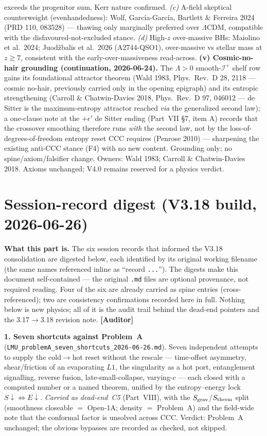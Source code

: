 \documentclass[11pt]{article}
\newcommand{\Auditor}{\textbf{\textcolor{teal!55!black}{[Auditor]}}}
\begin{document}
{exceeds the progenitor sum, Kerr nature confirmed. \emph{(c)} A-field skeptical counterweight (evenhandedness): Wolf, Garc\'ia-Garc\'ia, Bartlett \& Ferreira 2024 (PRD 110, 083528) --- thawing only marginally preferred over $\Lambda$CDM, compatible with the disfavoured-not-excluded stance. \emph{(d)} High-$z$ over-massive BHs: Maiolino et al.\ 2024; Juod\v{z}balis et al.\ 2026 (A2744-QSO1), over-massive vs stellar mass at $z\gtrsim7$, consistent with the early-over-massiveness read-across. \textbf{(v) Cosmic-no-hair grounding (continuation, 2026-06-24).} The $\Lambda>0$ smooth-$\mathscr I^+$ shelf row gains its foundational attractor theorem (Wald 1983, Phys.\ Rev.\ D 28, 2118 --- cosmic no-hair, previously carried only in the opening epigraph) and its entropic strengthening (Carroll \& Chatwin-Davies 2018, Phys.\ Rev.\ D 97, 046012 --- de Sitter is the maximum-entropy attractor reached \emph{via} the generalized second law); a one-clause note at the $+\epsilon'$ de Sitter ending (Part~VII \S7, item A) records that the crossover smoothing therefore runs \emph{with} the second law, not by the loss-of-degrees-of-freedom entropy reset CCC requires (Penrose 2010) --- sharpening the existing anti-CCC stance (F4) with no new content. Grounding only; no spine/axiom/falsifier change. Owners: Wald 1983; Carroll \& Chatwin-Davies 2018. Axioms unchanged; V4.0 remains reserved for a physics verdict.

}

\part{Session-record digest (V3.18 build, 2026-06-26)}
\noindent\textbf{What this part is.} The six session records that informed the V3.18 consolidation are digested below, each identified by its original working filename (the same names referenced inline as ``record \texttt{...}''). The digests make this document self-contained --- the original \texttt{.md} files are optional provenance, not required reading. Four of the six are already carried as spine entries (cross-referenced); two are consistency confirmations recorded here in full. Nothing below is new physics; all of it is the audit trail behind the dead-end pointers and the 3.17$\to$3.18 revision note. \Auditor

\smallskip\noindent\textbf{1. Seven shortcuts against Problem~A} (\texttt{LMU\_problemA\_seven\_shortcuts\_2026-06-26.md}). Seven independent attempts to supply the cold$\to$hot reset without the rescale --- time-offset asymmetry, shear/friction of an evaporating $L1$, the singularity as a hot port, entanglement signalling, reverse fusion, late-small-collapse, varying-$c$ --- each closed with a computed number or a named theorem, unified by the entropy--energy lock $S\!\downarrow\Leftrightarrow E\!\downarrow$. \emph{Carried as dead-end~C5} (Part~VIII), with the $S_{\rm grav}$/$S_{\rm therm}$ split (smoothness closeable $=$ Open-1A; density $=$ Problem~A) and the field-wide note that the conformal factor is unsolved across CCC. Verdict: Problem~A unchanged; the obvious bypasses are recorded as checked, not skipped.
\end{document}
